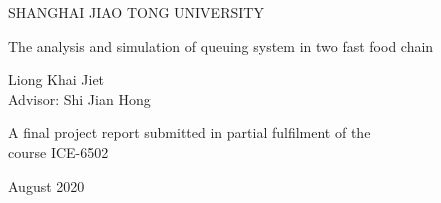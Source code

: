 \begin{center}
    {\large SHANGHAI JIAO TONG UNIVERSITY}
\end{center}
\vspace{6cm}

\begin{center}

    \Huge The analysis and simulation of queuing system in two fast food chain\\
    \vspace{.5cm}


\end{center}
\vspace{2.5cm}
\begin{center}
    \Large Liong Khai Jiet\\Advisor: Shi Jian Hong
\end{center}

\vspace{8cm}
\begin{center}
    {\large A final project report submitted in partial fulfilment of the \\course ICE-6502 }
\end{center}

\begin{center}
    {\large August 2020}
\end{center}